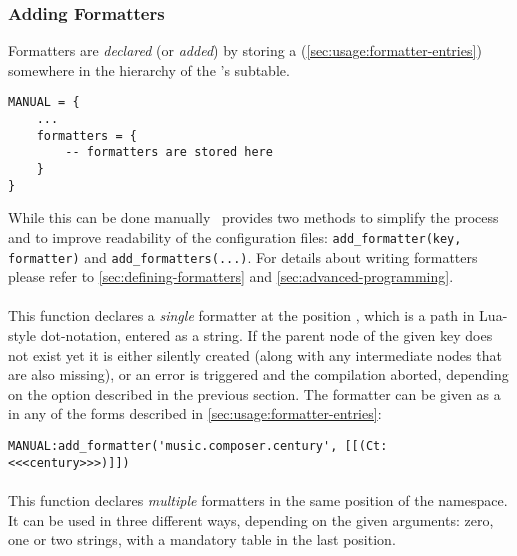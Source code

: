 \documentclass[12pt]{scrartcl}
\begin{document}
\subsubsection{Adding Formatters}
\label{sec:usage-adding-formatters}

Formatters are \emph{declared} (or \emph{added}) by storing a  (\vref{sec:usage:formatter-entries}) somewhere in the hierarchy of the
's  subtable.

\begin{verbatim}
MANUAL = {
	...
	formatters = {
		-- formatters are stored here
	}
}
\end{verbatim}

\noindent While this can be done manually \luaformatters\ provides two methods to
simplify the process and to improve readability of the configuration files:
\texttt{add_formatter(key, formatter)} and
\texttt{add_formatters(...)}.  For details about writing formatters
please refer to \vref{sec:defining-formatters} and
\vref{sec:advanced-programming}.


\paragraph{}

This function declares a \emph{single} formatter at the position ,
which is a path in Lua-style dot-notation, entered as a string.  If the parent
node of the given key does not exist yet it is either silently created (along
with any intermediate nodes that are also missing), or an error is triggered and
the compilation aborted, depending on the  option described in
the previous section. The formatter can be given as a  in
any of the forms described in \vref{sec:usage:formatter-entries}:

\begin{verbatim}
MANUAL:add_formatter('music.composer.century', [[(Ct: <<<century>>>)]])
\end{verbatim}

\paragraph{}

This function declares \emph{multiple} formatters in the same position of the
namespace.  It can be used in three different ways, depending on the given
arguments: zero, one or two strings, with a mandatory table in the last
position.
\end{document}
